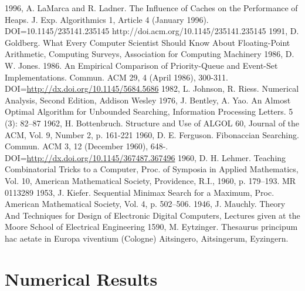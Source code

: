 \documentclass[preprint,1p,times]{elsarticle}
\begin{document}
\begin{thebibliography}{9}
 1996, A. LaMarca and R. Ladner. The Influence of Caches on the Performance of Heaps. J. Exp. Algorithmics 1, Article 4 (January 1996). DOI=10.1145/235141.235145 http://doi.acm.org/10.1145/235141.235145
 1991, D. Goldberg. What Every Computer Scientist Should Know About Floating-Point Arithmetic, Computing Surveys, Association for Computing Machinery
 1986, D. W. Jones. 1986. An Empirical Comparison of Priority-Queue and Event-Set Implementations. Commun. ACM 29, 4 (April 1986), 300-311. DOI=\url{http://dx.doi.org/10.1145/5684.5686}
 1982, L. Johnson, R. Riess. Numerical Analysis, Second Edition, Addison Wesley
 1976, J. Bentley, A. Yao. An Almost Optimal Algorithm for Unbounded Searching, Information Processing Letters. 5 (3): 82–87
 1962, H. Bottenbruch. Structure and Use of ALGOL 60, Journal of the ACM, Vol. 9, Number 2, p. 161-221
 1960, D. E. Ferguson. Fibonaccian Searching. Commun. ACM 3, 12 (December 1960), 648-. DOI=\url{http://dx.doi.org/10.1145/367487.367496}
 1960, D. H. Lehmer. Teaching Combinatorial Tricks to a Computer, Proc. of Symposia in Applied Mathematics, Vol. 10, American Mathematical Society, Providence, R.I., 1960, p. 179–193. MR 0113289
 1953, J. Kiefer. Sequential Minimax Search for a Maximum, Proc. American Mathematical Society, Vol. 4, p. 502–506.
 1946, J. Mauchly. Theory And Techniques for Design of Electronic Digital Computers, Lectures given at the Moore School of Electrical Engineering
 1590, M. Eytzinger. Thesaurus principum hac aetate in Europa viventium (Cologne)
Aitsingero, Aitsingerum, Eyzingern.
\end{thebibliography}



\pagebreak
\appendix

\section{Numerical Results}
\end{document}
